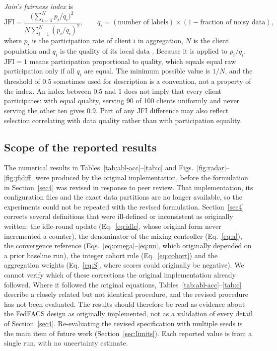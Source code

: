 \documentclass[pdflatex,sn-basic]{sn-jnl}
\begin{document}
\emph{Jain's fairness index} \citep{shi2024,cho2020} is
\begin{equation}\label{eq:jfi}
\mathrm{JFI}=\frac{\bigl(\sum_{i=1}^{N}p_i/q_i\bigr)^2}{N\sum_{i=1}^{N}(p_i/q_i)^2},\qquad q_i=(\text{number of labels})\times(1-\text{fraction of noisy data}),
\end{equation}
where $p_i$ is the participation rate of client $i$ in aggregation, $N$ is the client population and $q_i$ is the quality of its local data \citep{shi2023}. Because it is applied to $p_i/q_i$, $\mathrm{JFI}=1$ means participation proportional to quality, which equals equal raw participation only if all $q_i$ are equal. The minimum possible value is $1/N$, and the threshold of 0.5 sometimes used for description is a convention, not a property of the index. An index between 0.5 and 1 does not imply that every client participates: with equal quality, serving 90 of 100 clients uniformly and never serving the other ten gives $0.9$. Part of any JFI difference may also reflect selection correlating with data quality rather than with participation equality.

\subsection{Scope of the reported results}\label{sec:scope}
The numerical results in Tables~\ref{tab:abl-acc}--\ref{tab:c} and Figs.~\ref{fig:radar}--\ref{fig:jfidiff} were produced by the original implementation, before the formulation in Section~\ref{sec4} was revised in response to peer review. That implementation, its configuration files and the exact data partitions are no longer available, so the experiments could not be repeated with the revised formulation. Section~\ref{sec4} corrects several definitions that were ill-defined or inconsistent as originally written: the idle-round update (Eq.~\ref{eq:idle}, whose original form never incremented a counter), the denominator of the mixing controller (Eq.~\ref{eq:a}), the convergence reference (Eqs.~\ref{eq:omega}--\ref{eq:nu}, which originally depended on a prior baseline run), the integer cohort rule (Eq.~\ref{eq:cohort}) and the aggregation weights (Eq.~\ref{eq:S}, where scores could originally be negative). We cannot verify which of these corrections the original implementation already followed. Where it followed the original equations, Tables~\ref{tab:abl-acc}--\ref{tab:c} describe a closely related but not identical procedure, and the revised procedure has not been evaluated. The results should therefore be read as evidence about the FedFACS design as originally implemented, not as a validation of every detail of Section~\ref{sec4}. Re-evaluating the revised specification with multiple seeds is the main item of future work (Section~\ref{sec:limits}). Each reported value is from a single run, with no uncertainty estimate.
\end{document}
